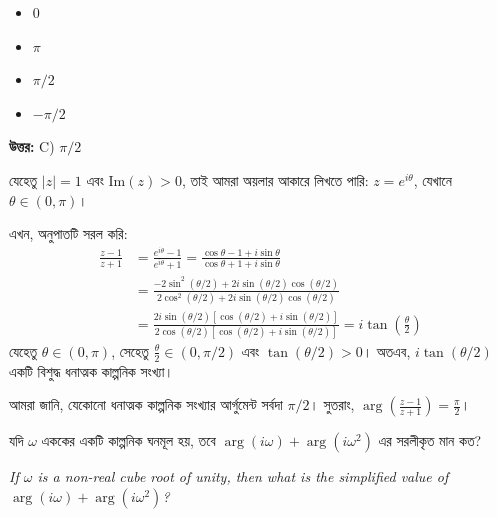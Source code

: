 \documentclass[12pt, a4paper]{article}
\begin{document}
\begin{itemize}[label={}, leftmargin=1cm, itemsep=0.5em]
    \item[\textbf{A)}] $0$
    \item[\textbf{B)}] $\pi$
    \item[\textbf{C)}] $\pi/2$
    \item[\textbf{D)}] $-\pi/2$
\end{itemize}

\vspace{0.5em}
\begin{tcolorbox}[answerbox]
    \textbf{\color{success} উত্তর:} C) $\pi/2$
\end{tcolorbox}
\vspace{1em}

\begin{tcolorbox}[solutionbox={সমাধান (Solution)}]
    \noindent
    যেহেতু $|z| = 1$ এবং $\text{Im}(z) > 0$, তাই আমরা অয়লার আকারে লিখতে পারি: $z = e^{i\theta}$, যেখানে $\theta \in (0, \pi)$। 
    
    এখন, অনুপাতটি সরল করি:
    \begin{align*}
        \frac{z-1}{z+1} &= \frac{e^{i\theta}-1}{e^{i\theta}+1} = \frac{\cos\theta - 1 + i\sin\theta}{\cos\theta + 1 + i\sin\theta} \\
        &= \frac{-2\sin^2(\theta/2) + 2i\sin(\theta/2)\cos(\theta/2)}{2\cos^2(\theta/2) + 2i\sin(\theta/2)\cos(\theta/2)} \\
        &= \frac{2i\sin(\theta/2)[\cos(\theta/2) + i\sin(\theta/2)]}{2\cos(\theta/2)[\cos(\theta/2) + i\sin(\theta/2)]} = i\tan\left(\frac{\theta}{2}\right)
    \end{align*}
    যেহেতু $\theta \in (0, \pi)$, সেহেতু $\frac{\theta}{2} \in (0, \pi/2)$ এবং $\tan(\theta/2) > 0$। অতএব, $i\tan(\theta/2)$ একটি বিশুদ্ধ ধনাত্মক কাল্পনিক সংখ্যা। 
    
    আমরা জানি, যেকোনো ধনাত্মক কাল্পনিক সংখ্যার আর্গুমেন্ট সর্বদা $\pi/2$। সুতরাং, $\arg\left(\frac{z-1}{z+1}\right) = \frac{\pi}{2}$।
\end{tcolorbox}

\vspace{1em}

\begin{tcolorbox}[questionbox={প্রশ্ন (Question) 15}]
    \noindent
    যদি $\omega$ এককের একটি কাল্পনিক ঘনমূল হয়, তবে $\arg(i\omega) + \arg(i\omega^2)$ এর সরলীকৃত মান কত?
    
    \vspace{0.8em}
    \begin{english}
    \noindent\textit{\color{darkgray}
    If $\omega$ is a non-real cube root of unity, then what is the simplified value of $\arg(i\omega) + \arg(i\omega^2)$?
    }
    \end{english}
\end{tcolorbox}
\end{document}
